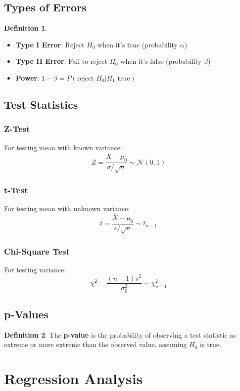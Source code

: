 \documentclass[11pt]{article}
\theoremstyle{definition}
\newtheorem{definition}{Definition}[section]
\begin{document}
\subsection{Types of Errors}
\begin{definition}
\begin{itemize}
    \item \textbf{Type I Error}: Reject $H_0$ when it's true (probability $\alpha$)
    \item \textbf{Type II Error}: Fail to reject $H_0$ when it's false (probability $\beta$)
    \item \textbf{Power}: $1 - \beta = P(\text{reject } H_0 | H_1 \text{ true})$
\end{itemize}
\end{definition}

\subsection{Test Statistics}

\subsubsection{Z-Test}
For testing mean with known variance:
$$Z = \frac{\bar{X} - \mu_0}{\sigma/\sqrt{n}} \sim \mathcal{N}(0,1)$$

\subsubsection{t-Test}
For testing mean with unknown variance:
$$t = \frac{\bar{X} - \mu_0}{s/\sqrt{n}} \sim t_{n-1}$$

\subsubsection{Chi-Square Test}
For testing variance:
$$\chi^2 = \frac{(n-1)s^2}{\sigma_0^2} \sim \chi^2_{n-1}$$

\subsection{p-Values}
\begin{definition}
The \textbf{p-value} is the probability of observing a test statistic as extreme or more extreme than the observed value, assuming $H_0$ is true.
\end{definition}

\section{Regression Analysis}
\end{document}
